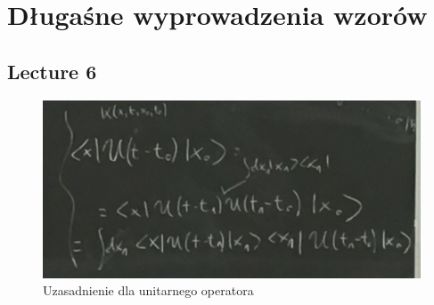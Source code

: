 \documentclass[12pt,a4paper]{report}
\begin{document}
\chapter{Długaśne wyprowadzenia wzorów}

\section{Lecture 6}

\begin{figure}[!ht]
        \centering
        \includegraphics[width=\linewidth]{App_6_Rys_1.JPG}
        \caption{Uzasadnienie dla unitarnego operatora}
        \label{fig:app_6:unitarny}
\end{figure}
\end{document}
